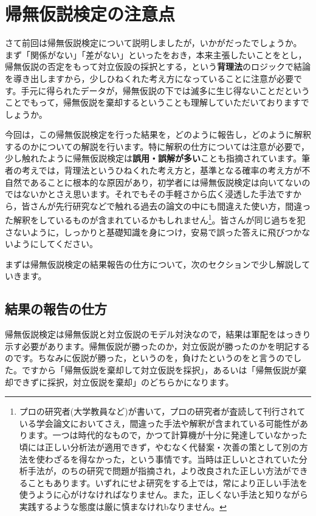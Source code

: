 \documentclass{ltjsarticle}
\begin{document}
\chapter{帰無仮説検定の注意点}
\label{chapter19}
さて前回は帰無仮説検定について説明しましたが，いかがだったでしょうか。
まず「関係がない」「差がない」といったをおき，本来主張したいことをとし，帰無仮説の否定をもって対立仮設の採択とする，という\textbf{背理法}のロジックで結論を導き出しますから，少しひねくれた考え方になっていることに注意が必要です。手元に得られたデータが，帰無仮説の下では滅多に生じ得ないことだということでもって，帰無仮説を棄却するということも理解していただいておりますでしょうか。

今回は，この帰無仮説検定を行った結果を，どのように報告し，どのように解釈するのかについての解説を行います。特に解釈の仕方については注意が必要で，少し触れたように帰無仮説検定は\textbf{誤用・誤解が多い}ことも指摘されています。筆者の考えでは，背理法というひねくれた考え方と，基準となる確率の考え方が不自然であることに根本的な原因があり，初学者には帰無仮説検定は向いてないのではないかとさえ思います。それでもその手軽さから広く浸透した手法ですから，皆さんが先行研究などで触れる過去の論文の中にも間違えた使い方，間違った解釈をしているものが含まれているかもしれません\footnote{プロの研究者(大学教員など)が書いて，プロの研究者が査読して刊行されている学会論文においてさえ，間違った手法や解釈が含まれている可能性があります。一つは時代的なもので，かつて計算機が十分に発達していなかった頃には正しい分析法が適用できず，やむなく代替案・次善の策として別の方法を使わざるを得なかった，という事情です。当時は正しいとされていた分析手法が，のちの研究で問題が指摘され，より改良された正しい方法ができることもあります。いずれにせよ研究をする上では，常により正しい手法を使うように心がけなければなりません。また，正しくない手法と知りながら実践するような態度は厳に慎まなけれbなりません。}。皆さんが同じ過ちを犯さないように，しっかりと基礎知識を身につけ，安易で誤った答えに飛びつかないようにしてください。

まずは帰無仮説検定の結果報告の仕方について，次のセクションで少し解説していきます。

\section{結果の報告の仕方}
帰無仮説検定は帰無仮説と対立仮説のモデル対決なので，結果は軍配をはっきり示す必要があります。帰無仮説が勝ったのか，対立仮説が勝ったのかを明記するのです。ちなみに仮説が勝った，というのを，負けたというのをと言うのでした。ですから「帰無仮説を棄却して対立仮説を採択」，あるいは「帰無仮説が棄却できずに採択，対立仮説を棄却」のどちらかになります。
\end{document}
